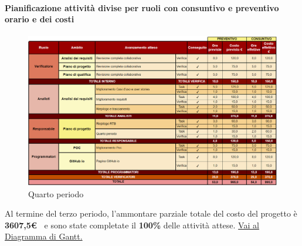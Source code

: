 \newpage
\paragraph{Pianificazione attività divise per ruoli con consuntivo e preventivo orario e dei costi}\hspace{1pt}

\begin{figure}[H]
    \centering
    \includegraphics[width=\linewidth, height=0.9\textheight, keepaspectratio]{../Images/periodo4.PNG}
    \caption{Quarto periodo}
    \label{fig:Quarto_periodo}
\end{figure}


Al termine del terzo periodo, l'ammontare parziale totale del costo del progetto è \textbf{ 3607,5\euro\ } e sono state completate il \textbf{100\%} delle attività attese.
\href{https://github.com/orgs/ByteOps-swe/projects/3/views/1?sortedBy%5Bdirection%5D=asc&sortedBy%5BcolumnId%5D=64182560}{Vai al Diagramma di Gantt.}\hspace{1pt}


